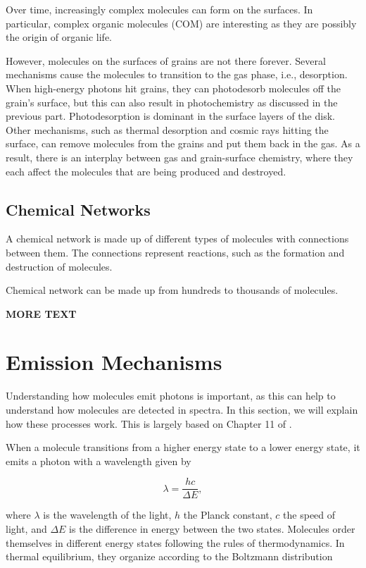 \documentclass[oneside, single, authoryear, semicolon, 12pt]{lion-msc}
\newcommand{\4}{$_4$}
\newcommand{\3}{$_3$}
\newcommand{\2}{$_2$}
\begin{document}
Over time, increasingly complex molecules can form on the surfaces. In particular, complex organic molecules (COM) are interesting as they are possibly the origin of organic life. 

However, molecules on the surfaces of grains are not there forever. Several mechanisms cause the molecules to transition to the gas phase, i.e., desorption. When high-energy photons hit grains, they can photodesorb molecules off the grain's surface, but this can also result in photochemistry as discussed in the previous part. Photodesorption is dominant in the surface layers of the disk. Other mechanisms, such as thermal desorption and cosmic rays hitting the surface, can remove molecules from the grains and put them back in the gas. As a result, there is an interplay between gas and grain-surface chemistry, where they each affect the molecules that are being produced and destroyed.

\subsection{Chemical Networks}
A chemical network is made up of different types of molecules with connections between them. The connections represent reactions, such as the formation and destruction of molecules. 

Chemical network can be made up from hundreds to thousands of molecules. 

\textbf{MORE TEXT}

\newpage
\section{Emission Mechanisms}
Understanding how molecules emit photons is important, as this can help to understand how molecules are detected in spectra. In this section, we will explain how these processes work. This is largely based on Chapter 11 of \cite{1979rpa..book.....R}. 

When a molecule transitions from a higher energy state to a lower energy state, it emits a photon with a wavelength given by

\begin{equation}
    \lambda=\frac{hc}{\Delta E},
\end{equation}

where $\lambda$ is the wavelength of the light, $h$ the Planck constant, $c$ the speed of light, and $\Delta E$ is the difference in energy between the two states. Molecules order themselves in different energy states following the rules of thermodynamics. In thermal equilibrium, they organize according to the Boltzmann distribution 
\end{document}
